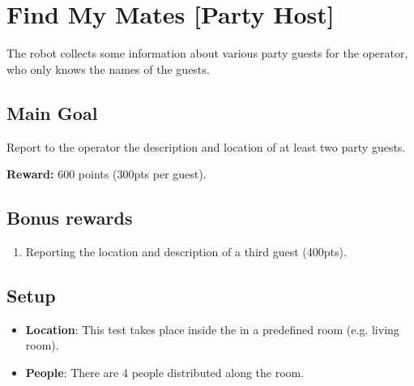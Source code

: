 \section{Find My Mates [Party Host]}
\label{test:find-my-mates}

The robot collects some information about various party guests for the operator, who only knows the names of the guests.

\subsection*{Main Goal}
Report to the operator the description and location of at least two party guests.

\noindent\textbf{Reward:} 600 points (300pts per guest).

\subsection*{Bonus rewards}
\begin{enumerate}[nosep]
	\item Reporting the location and description of a third guest (400pts).
\end{enumerate}
\subsection*{Setup}
\begin{itemize}
	\item \textbf{Location}: This test takes place inside the \Arena{} in a predefined room (e.g. living room).
	\item \textbf{People}: There are 4 people distributed along the room.
\end{itemize}

